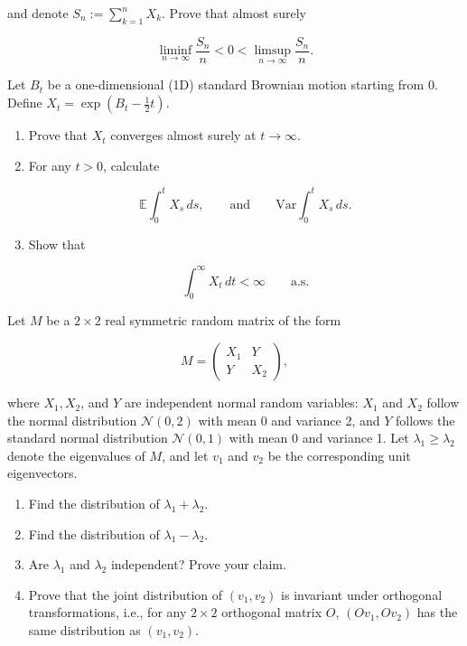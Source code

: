 \documentclass[11pt,a4paper]{article}
\newcommand{\examstatement}[1]{%
  \par\addvspace{0.85em}%
  \noindent{\bfseries #1}\par\nobreak\addvspace{0.28em}%
}
\begin{document}
and denote \( S_n := \sum_{k=1}^n X_k \). Prove that almost surely

\[
\liminf_{n \to \infty} \frac{S_n}{n} < 0 < \limsup_{n \to \infty} \frac{S_n}{n}.
\]

\examstatement{Problem 5. [10 pts.]}
Let \( B_t \) be a one-dimensional (1D) standard Brownian motion starting from 0. Define \( X_t = \exp(B_t - \tfrac{1}{2} t) \).
\begin{enumerate}[label=(\alph*)]
    \item Prove that \( X_t \) converges almost surely at \( t \to \infty \).
    \item For any \( t > 0 \), calculate

    \[
    \mathbb{E} \int_0^t X_s\, ds, \qquad \text{and} \qquad \mathrm{Var} \int_0^t X_s\, ds.
    \]
    \item Show that

    \[
    \int_0^\infty X_t\, dt < \infty \qquad \text{a.s.}
    \]
\end{enumerate}

\examstatement{Problem 6. [15 pts.]}
Let \( M \) be a \( 2 \times 2 \) real symmetric random matrix of the form

\[
M = \begin{pmatrix} X_1 & Y \\ Y & X_2 \end{pmatrix},
\]

where \( X_1, X_2 \), and \( Y \) are independent normal random variables: \( X_1 \) and \( X_2 \) follow the normal distribution \( \mathcal{N}(0, 2) \) with mean 0 and variance 2, and \( Y \) follows the standard normal distribution \( \mathcal{N}(0, 1) \) with mean 0 and variance 1. Let \( \lambda_1 \ge \lambda_2 \) denote the eigenvalues of \( M \), and let \( v_1 \) and \( v_2 \) be the corresponding unit eigenvectors.
\begin{enumerate}[label=(\alph*)]
    \item Find the distribution of \( \lambda_1 + \lambda_2 \).
    \item Find the distribution of \( \lambda_1 - \lambda_2 \).
    \item Are \( \lambda_1 \) and \( \lambda_2 \) independent? Prove your claim.
    \item Prove that the joint distribution of \( (v_1, v_2) \) is invariant under orthogonal transformations, i.e., for any \( 2 \times 2 \) orthogonal matrix \( O \), \( (O v_1, O v_2) \) has the same distribution as \( (v_1, v_2) \).
\end{enumerate}
\end{document}
